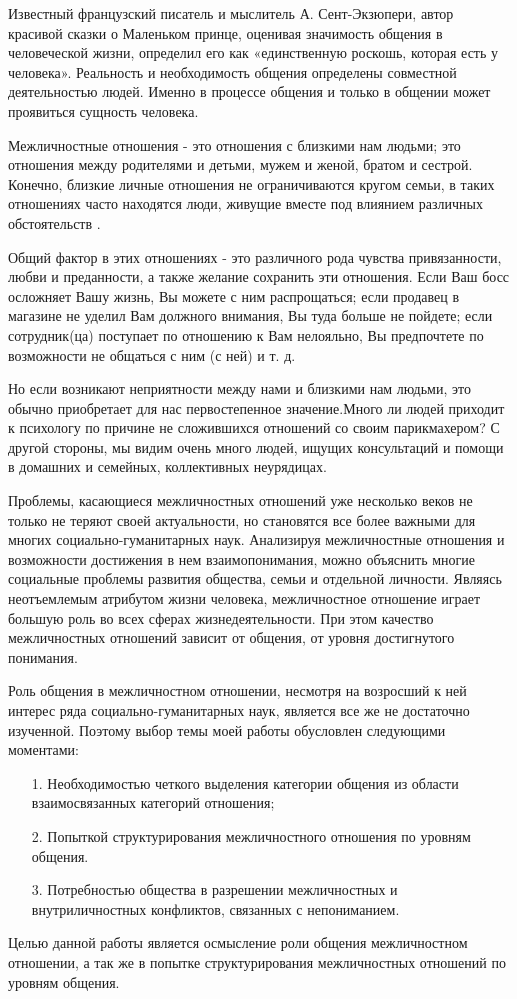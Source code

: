 Известный французский писатель и мыслитель А. Сент-Экзюпери, автор красивой сказки о Маленьком принце, оценивая значимость общения в человеческой жизни, определил его как «единственную роскошь, которая есть у человека». Реальность и необходимость общения определены совместной деятельностью людей. Именно в процессе общения и только в общении может проявиться сущность человека.

Межличностные отношения - это отношения с близкими нам людьми; это отношения между родителями и детьми, мужем и женой, братом и сестрой. Конечно, близкие личные отношения не ограничиваются кругом семьи, в таких отношениях часто находятся люди, живущие вместе под влиянием различных обстоятельств \cite{3}. 

Общий фактор в этих отношениях - это различного рода чувства привязанности, любви и преданности, а также желание сохранить эти отношения. Если Ваш босс осложняет Вашу жизнь, Вы можете с ним распрощаться; если продавец в магазине не уделил Вам должного внимания, Вы туда больше не пойдете; если сотрудник(ца) поступает по отношению к Вам нелояльно, Вы предпочтете по возможности не общаться с ним (с ней) и т. д. 

Но если возникают неприятности между нами и близкими нам людьми, это обычно приобретает для нас первостепенное значение.Много ли людей приходит к психологу по причине не сложившихся отношений со своим парикмахером? С другой стороны, мы видим очень много людей, ищущих консультаций и помощи в домашних и семейных, коллективных неурядицах. 

Проблемы, касающиеся межличностных отношений уже несколько веков не только не теряют своей актуальности, но становятся все более важными для многих социально-гуманитарных наук. Анализируя межличностные отношения и возможности достижения в нем взаимопонимания, можно объяснить многие социальные проблемы развития общества, семьи и отдельной личности. Являясь неотъемлемым атрибутом жизни человека, межличностное отношение играет большую роль во всех сферах жизнедеятельности. При этом качество межличностных отношений зависит от общения, от уровня достигнутого понимания. 

Роль общения в межличностном отношении, несмотря на возросший к ней интерес ряда социально-гуманитарных наук, является все же не достаточно изученной. Поэтому выбор темы моей работы обусловлен следующими моментами: 
\begin{enumerate}
	\item[1.] Необходимостью четкого выделения категории общения из области взаимосвязанных категорий отношения; 
	\item[2.] Попыткой структурирования межличностного отношения по уровням общения. 
	\item[3.] Потребностью общества в разрешении межличностных и внутриличностных конфликтов, связанных с непониманием. 
\end{enumerate}

Целью данной работы является осмысление роли общения межличностном отношении, а так же в попытке структурирования межличностных отношений по уровням общения. 
